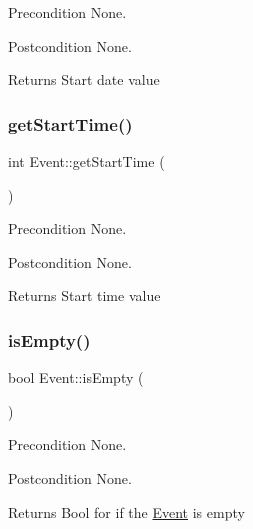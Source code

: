 \begin{DoxyPrecond}{Precondition}
None. 
\end{DoxyPrecond}
\begin{DoxyPostcond}{Postcondition}
None. 
\end{DoxyPostcond}
\begin{DoxyReturn}{Returns}
Start date value 
\end{DoxyReturn}
\hypertarget{class_event_a3283554ea0739c5c1916269f1a498bb7}{}\label{class_event_a3283554ea0739c5c1916269f1a498bb7} 
\subsubsection{\texorpdfstring{get\+Start\+Time()}{getStartTime()}}
{\footnotesize\ttfamily int Event\+::get\+Start\+Time (\begin{DoxyParamCaption}{ }\end{DoxyParamCaption})}

\begin{DoxyPrecond}{Precondition}
None. 
\end{DoxyPrecond}
\begin{DoxyPostcond}{Postcondition}
None. 
\end{DoxyPostcond}
\begin{DoxyReturn}{Returns}
Start time value 
\end{DoxyReturn}
\hypertarget{class_event_a690ef00dbb8205ad6807b286f02db956}{}\label{class_event_a690ef00dbb8205ad6807b286f02db956} 
\subsubsection{\texorpdfstring{is\+Empty()}{isEmpty()}}
{\footnotesize\ttfamily bool Event\+::is\+Empty (\begin{DoxyParamCaption}{ }\end{DoxyParamCaption})}

\begin{DoxyPrecond}{Precondition}
None. 
\end{DoxyPrecond}
\begin{DoxyPostcond}{Postcondition}
None. 
\end{DoxyPostcond}
\begin{DoxyReturn}{Returns}
Bool for if the \hyperlink{class_event}{Event} is empty 
\end{DoxyReturn}
\hypertarget{class_event_ac3dee16c5287bac33ab0c805089caaa0}{}\label{class_event_ac3dee16c5287bac33ab0c805089caaa0} 
